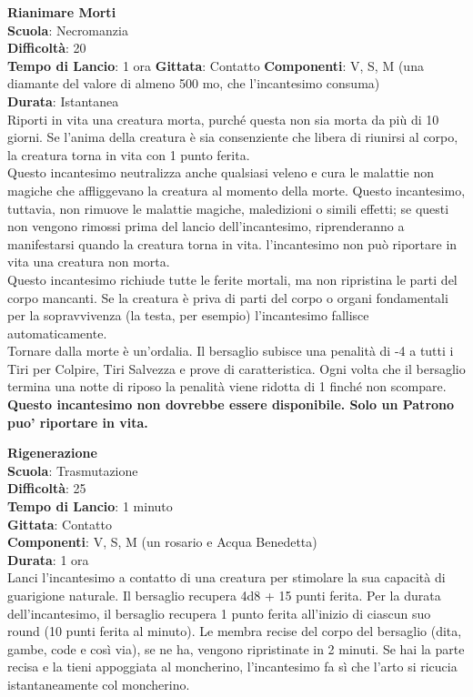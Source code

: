 \begin{multicols}{2}
\medskip\textbf{Rianimare Morti}\\
\textbf{Scuola}: Necromanzia\\
\textbf{Difficoltà}:  20\\
\textbf{Tempo di Lancio}: 1 ora
\textbf{Gittata}: Contatto
\textbf{Componenti}: V, S, M (una diamante del valore di almeno 500 mo, che l'incantesimo consuma)\\
\textbf{Durata}: Istantanea\\
Riporti in vita una creatura morta, purché questa non sia morta da più di 10 giorni. Se l’anima della creatura è sia consenziente che libera di riunirsi al corpo, la creatura torna in vita con 1 punto ferita.\\
Questo incantesimo neutralizza anche qualsiasi veleno e cura le malattie non magiche che affliggevano la creatura al momento della morte. Questo incantesimo, tuttavia, non rimuove le malattie magiche, maledizioni o simili effetti; se questi non vengono rimossi prima del lancio dell'incantesimo, riprenderanno a manifestarsi quando la creatura torna in vita. l'incantesimo non può riportare in vita una creatura non morta.\\
Questo incantesimo richiude tutte le ferite mortali, ma non ripristina le parti del corpo mancanti. Se la creatura è priva di parti del corpo o organi fondamentali per la sopravvivenza (la testa, per esempio) l'incantesimo fallisce automaticamente.\\
Tornare dalla morte è un'ordalia. Il bersaglio subisce una penalità di -4 a tutti i Tiri per Colpire, Tiri Salvezza e prove di caratteristica. Ogni volta che il bersaglio termina una notte di riposo la penalità viene ridotta di 1 finché non scompare.\\
\textbf{Questo incantesimo non dovrebbe essere disponibile. Solo un Patrono puo' riportare in vita.}

\medskip\textbf{Rigenerazione}\\
\textbf{Scuola}: Trasmutazione\\
\textbf{Difficoltà}:  25\\
\textbf{Tempo di Lancio}: 1 minuto\\
\textbf{Gittata}: Contatto\\
\textbf{Componenti}: V, S, M (un rosario e Acqua Benedetta)\\
\textbf{Durata}: 1 ora\\
Lanci l'incantesimo a contatto di una creatura per stimolare la sua capacità di guarigione naturale. Il bersaglio recupera 4d8 + 15 punti ferita. Per la durata dell'incantesimo, il bersaglio recupera 1 punto ferita all'inizio di ciascun suo round (10 punti ferita al minuto). Le membra recise del corpo del bersaglio (dita, gambe, code e così via), se ne ha, vengono ripristinate in 2 minuti. Se hai la parte recisa e la tieni appoggiata al moncherino, l'incantesimo fa sì che l’arto si ricucia istantaneamente col moncherino.


\end{multicols}

